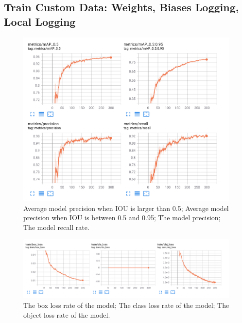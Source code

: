 \subsection{Train Custom Data: Weights, Biases Logging, Local Logging}

\begin{figure}[t]
    \centerline{\includegraphics[width=\columnwidth]{img/colab_metrics.png}}
    \caption{Average model precision when IOU is larger than 0.5; Average model precision when IOU is between 0.5 and 0.95; The model precision; The model recall rate.}
    \label{fig:colab_metrics}
\end{figure}

\begin{figure}[t]
    \centerline{\includegraphics[width=\columnwidth]{img/colab_train.png}}
    \caption{The box loss rate of the model; The class loss rate of the model; The object loss rate of the model.}
    \label{fig:colab_train}
\end{figure}

